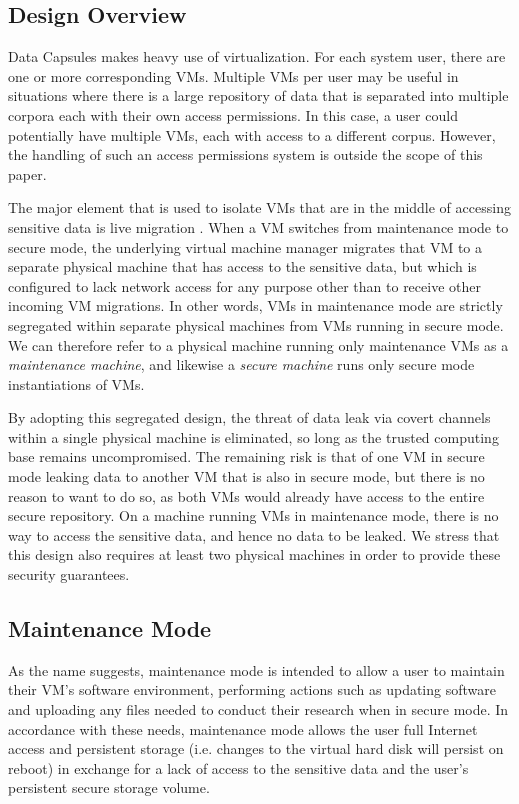 \documentclass{acm_proc_article-sp}
\begin{document}
\subsection{Design Overview}

Data Capsules makes heavy use of virtualization.  For each system user, there
are one or more corresponding VMs.  Multiple VMs per user may be useful in
situations where there is a large repository of data that is separated into
multiple corpora each with their own access permissions.  In this case, a user
could potentially have multiple VMs, each with access to a different corpus.
However, the handling of such an access permissions system is outside the scope
of this paper.

The major element that is used to isolate VMs that are in the middle of
accessing sensitive data is live migration \cite{migration-clark}.  When a VM
switches from maintenance mode to secure mode, the underlying virtual machine
manager migrates that VM to a separate physical machine that has access to the
sensitive data, but which is configured to lack network access for any purpose
other than to receive other incoming VM migrations.  In other words, VMs in
maintenance mode are strictly segregated within separate physical machines from
VMs running in secure mode.  We can therefore refer to a physical machine
running only maintenance VMs as a \emph{maintenance machine}, and likewise a
\emph{secure machine} runs only secure mode instantiations of VMs.

By adopting this segregated design, the threat of data leak via covert channels
within a single physical machine is eliminated, so long as the trusted computing
base remains uncompromised.  The remaining risk is that of one VM in secure mode
leaking data to another VM that is also in secure mode, but there is no reason
to want to do so, as both VMs would already have access to the entire secure
repository.  On a machine running VMs in maintenance mode, there is no way to
access the sensitive data, and hence no data to be leaked.  We stress that this
design also requires at least two physical machines in order to provide these
security guarantees.

\subsection{Maintenance Mode}

As the name suggests, maintenance mode is intended to allow a user to maintain
their VM's software environment, performing actions such as updating software
and uploading any files needed to conduct their research when in secure mode.
In accordance with these needs, maintenance mode allows the user full Internet
access and persistent storage (i.e.  changes to the virtual hard disk will
persist on reboot) in exchange for a lack of access to the sensitive data and
the user's persistent secure storage volume.
\end{document}
